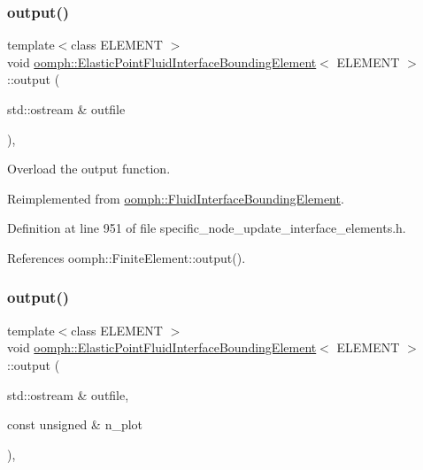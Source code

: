 \subsubsection{\texorpdfstring{output()}{output()}\hspace{0.1cm}{\footnotesize\ttfamily [1/4]}}
{\footnotesize\ttfamily template$<$class E\+L\+E\+M\+E\+NT $>$ \\
void \hyperlink{classoomph_1_1ElasticPointFluidInterfaceBoundingElement}{oomph\+::\+Elastic\+Point\+Fluid\+Interface\+Bounding\+Element}$<$ E\+L\+E\+M\+E\+NT $>$\+::output (\begin{DoxyParamCaption}\item[{std\+::ostream \&}]{outfile }\end{DoxyParamCaption})\hspace{0.3cm}{\ttfamily [inline]}, {\ttfamily [virtual]}}



Overload the output function. 



Reimplemented from \hyperlink{classoomph_1_1FluidInterfaceBoundingElement_a81adc5ae89ddfa120f587c61b972622f}{oomph\+::\+Fluid\+Interface\+Bounding\+Element}.



Definition at line 951 of file specific\+\_\+node\+\_\+update\+\_\+interface\+\_\+elements.\+h.



References oomph\+::\+Finite\+Element\+::output().

\mbox{\label{classoomph_1_1ElasticPointFluidInterfaceBoundingElement_a20c0678a9fdd6ef91fe48aa1b9209c38}} 
\subsubsection{\texorpdfstring{output()}{output()}\hspace{0.1cm}{\footnotesize\ttfamily [2/4]}}
{\footnotesize\ttfamily template$<$class E\+L\+E\+M\+E\+NT $>$ \\
void \hyperlink{classoomph_1_1ElasticPointFluidInterfaceBoundingElement}{oomph\+::\+Elastic\+Point\+Fluid\+Interface\+Bounding\+Element}$<$ E\+L\+E\+M\+E\+NT $>$\+::output (\begin{DoxyParamCaption}\item[{std\+::ostream \&}]{outfile,  }\item[{const unsigned \&}]{n\+\_\+plot }\end{DoxyParamCaption})\hspace{0.3cm}{\ttfamily [inline]}, {\ttfamily [virtual]}}




